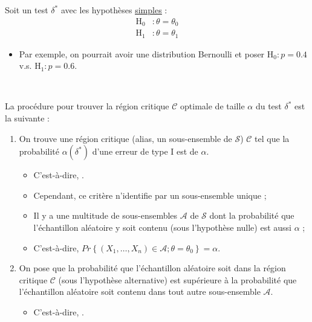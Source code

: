 \documentclass[10pt, french]{article}
\begin{document}
\begin{multicols*}{2}
\begin{definitionNOHFILLprop}[Tests optimaux]


Soit un test $\delta^{*}$ avec les hypothèses \hyperlink{hyp-simple}{\color{blue!80!white}\underline{simples}} :
\begin{align*}
	\mathrm{H}_{0}	&:	\theta	=	\theta_{0}	\\
	\mathrm{H}_{1}	&:	\theta	=	\theta_{1}
\end{align*}
\begin{itemize}
	\item	Par exemple, on pourrait avoir une distribution Bernoulli et poser $\mathrm{H}_{0}	:	p	=	0.4$ v.s. $\mathrm{H}_{1}	:	p	=	0.6$.
\end{itemize}
\

La procédure pour trouver la région critique $\mathcal{C}$ optimale de taille $\alpha$ du test $\delta^{\ast}$ est la suivante :
\begin{enumerate}
	\item	On trouve une région critique (alias, un sous-ensemble de $\mathcal{S}$) $\mathcal{C}$ tel que la probabilité $\alpha(\delta^{\ast})$ d'une erreur de type I est de $\alpha$.
		\begin{itemize}
		\item	C'est-à-dire, .
		\item	Cependant, ce critère n'identifie par un sous-ensemble unique ;
		\item	Il y a une multitude de sous-ensembles $\mathcal{A}$ de $\mathcal{S}$ dont la probabilité que l'échantillon aléatoire y soit contenu (sous l'hypothèse nulle) est aussi $\alpha$ ;
		\item	C'est-à-dire, $Pr\left\{(X_{1}, \dots, X_{n}) \in \mathcal{A}; \theta	=	\theta_{0}	\right\}	=	\alpha$.
		\end{itemize}
	\item	On pose que la probabilité que l'échantillon aléatoire soit dans la région critique $\mathcal{C}$ (sous l'hypothèse alternative) est supérieure à la probabilité que l'échantillon aléatoire soit contenu dans tout autre sous-ensemble $\mathcal{A}$.
		\begin{itemize}
		\item	C'est-à-dire,  .
		\end{itemize}
\end{enumerate}


\end{definitionNOHFILLprop}
\end{multicols*}
\end{document}
